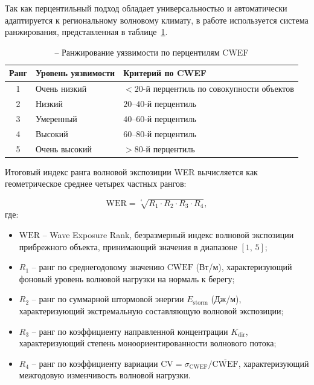 Так как перцентильный подход обладает универсальностью и автоматически адаптируется к региональному волновому климату, в работе используется система ранжирования, представленная в таблице~\ref{tab:cwef_percentiles}.
\begin{table}
\caption{-- Ранжирование уязвимости по перцентилям CWEF}
\label{tab:cwef_percentiles}
\centering
\begin{tabular}{c l l}
\toprule
\textbf{Ранг} & \textbf{Уровень уязвимости} & \textbf{Критерий по CWEF} \\
\midrule
1 & Очень низкий  & \makecell[l]{$< 20$-й перцентиль \\ по совокупности объектов} \\
2 & Низкий        & $20$--$40$-й перцентиль \\
3 & Умеренный     & $40$--$60$-й перцентиль \\
4 & Высокий       & $60$--$80$-й перцентиль \\
5 & Очень высокий & $> 80$-й перцентиль \\
\bottomrule
\end{tabular}
\end{table}

Итоговый индекс ранга волновой экспозиции WER вычисляется как геометрическое среднее четырех частных рангов:

\begin{equation}
    \label{eq:wer_index}
    \text{WER} = \sqrt[^4]{R_1 \cdot R_2 \cdot R_3 \cdot R_4},
\end{equation}
где:
\begin{itemize}
    \item $\text{WER}$ -- Wave Exposure Rank, безразмерный индекс волновой экспозиции прибрежного объекта, принимающий значения в диапазоне $[1,\,5]$;
    \item $R_1$ -- ранг по среднегодовому значению $\overline{\text{CWEF}}$ (Вт/м), характеризующий фоновый уровень волновой нагрузки на нормаль к берегу;
    \item $R_2$ -- ранг по суммарной штормовой энергии $E_\text{storm}$ (Дж/м), характеризующий экстремальную составляющую волновой экспозиции;
    \item $R_3$ -- ранг по коэффициенту направленной концентрации $K_\text{dir}$, характеризующий степень моноориентированности волнового потока;
    \item $R_4$ -- ранг по коэффициенту вариации $\text{CV} = \sigma_\text{CWEF}/\overline{\text{CWEF}}$, характеризующий межгодовую изменчивость волновой нагрузки.
\end{itemize}

